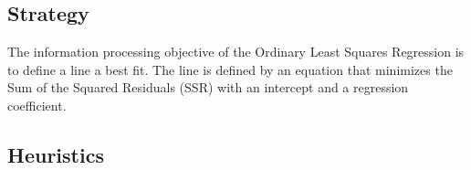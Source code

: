 \subsection{Strategy}
The information processing objective of the Ordinary Least Squares Regression is to define a line a best fit.
The line is defined by an equation that minimizes the Sum of the Squared Residuals (SSR) with an intercept and a regression coefficient.

\subsection{Heuristics}

